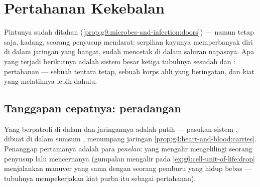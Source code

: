 \chapter{Pertahanan Kekebalan}\label{ch:g9:immune-defenses}

Pintunya sudah ditahan
(\cref{prop:g9:microbes-and-infection:doors}) --- namun tetap
saja, kadang, seorang penyusup mendarat:  serpihan
kayunya memperbanyak diri di dalam jaringan yang hangat,
 sudah mencetak di dalam  saluran napasnya. Apa
yang terjadi berikutnya adalah sistem besar ketiga tubuhnya
sesudah  dan : pertahanan  --- sebuah
tentara tetap, sebuah korps ahli yang beringatan, dan kiat
 yang melatihnya lebih dahulu.

\section{Tanggapan cepatnya: peradangan}

\begin{definition}\label{def:g9:immune-defenses:standing}
Yang berpatroli di dalam  dan jaringannya adalah 
 putih --- pasukan sistem
, dibuat di dalam sumsum , menumpang
jaringan \cref{prop:g4:heart-and-blood:carries}. Penanggap
pertamanya adalah para \emph{penelan}:  yang mengalir
mengelilingi seorang penyusup lalu mencernanya (gumpalan
mengalir pada \cref{ex:g6:cell-unit-of-life:drop}
menjalankan manuver yang sama dengan seorang pemburu yang
hidup bebas --- tubuhnya mempekerjakan kiat purba itu
sebagai pertahanan).
\end{definition}

